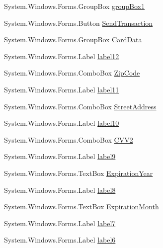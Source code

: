 \begin{DoxyCompactItemize}
\item 
System.\+Windows.\+Forms.\+Group\+Box \mbox{\hyperlink{class_form_sim_1_1_form1_aa2a4980aca0c0162f75dc47006579c5a}{group\+Box1}}
\item 
System.\+Windows.\+Forms.\+Button \mbox{\hyperlink{class_form_sim_1_1_form1_a25cf1c017027a578565ba3f5b6f1d999}{Send\+Transaction}}
\item 
System.\+Windows.\+Forms.\+Group\+Box \mbox{\hyperlink{class_form_sim_1_1_form1_a54b179ef9cabfd2e3e1838730a9ffb0b}{Card\+Data}}
\item 
System.\+Windows.\+Forms.\+Label \mbox{\hyperlink{class_form_sim_1_1_form1_ab544f40bb97ffdea24b6bace4ae4afc1}{label12}}
\item 
System.\+Windows.\+Forms.\+Combo\+Box \mbox{\hyperlink{class_form_sim_1_1_form1_af9522dc15f4938ce8468fa05ca8b1bd0}{Zip\+Code}}
\item 
System.\+Windows.\+Forms.\+Label \mbox{\hyperlink{class_form_sim_1_1_form1_a6f21487b9e8ff9baba33cda4fb0cd62c}{label11}}
\item 
System.\+Windows.\+Forms.\+Combo\+Box \mbox{\hyperlink{class_form_sim_1_1_form1_a81160df3bbe7347398f9a82ff66b1e13}{Street\+Address}}
\item 
System.\+Windows.\+Forms.\+Label \mbox{\hyperlink{class_form_sim_1_1_form1_adb8c4a009c6a2e7f4f0717a4b8fb7a14}{label10}}
\item 
System.\+Windows.\+Forms.\+Combo\+Box \mbox{\hyperlink{class_form_sim_1_1_form1_afe2488fe89c5a10df54ad5db76e2ae68}{C\+V\+V2}}
\item 
System.\+Windows.\+Forms.\+Label \mbox{\hyperlink{class_form_sim_1_1_form1_a931c11ada165f4111fdf92231d707ca8}{label9}}
\item 
System.\+Windows.\+Forms.\+Text\+Box \mbox{\hyperlink{class_form_sim_1_1_form1_aae3b97a32b9cc3f4585825becdda0ad8}{Expiration\+Year}}
\item 
System.\+Windows.\+Forms.\+Label \mbox{\hyperlink{class_form_sim_1_1_form1_a1335cd840952cd00c7d72d797cbb191e}{label8}}
\item 
System.\+Windows.\+Forms.\+Text\+Box \mbox{\hyperlink{class_form_sim_1_1_form1_ace6523c1c7c8f1c9f24a35137c1876bb}{Expiration\+Month}}
\item 
System.\+Windows.\+Forms.\+Label \mbox{\hyperlink{class_form_sim_1_1_form1_a3da1f60d5b86a5b470c6c901a9741bfc}{label7}}
\item 
System.\+Windows.\+Forms.\+Label \mbox{\hyperlink{class_form_sim_1_1_form1_a8874da97d5451e75fb5959216d038473}{label6}}
\item 

\end{DoxyCompactItemize}
